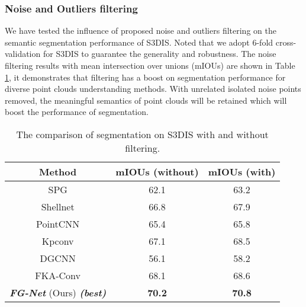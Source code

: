 \documentclass[journal]{IEEEtran}
\begin{document}
\subsubsection{Noise and Outliers filtering}
We have tested the influence of proposed noise and outliers filtering on the semantic segmentation performance of S3DIS. Noted that we adopt 6-fold cross-validation for S3DIS to guarantee the generality and robustness. The noise filtering results with mean intersection over unions (mIOUs) are shown in Table \ref{table_filter}, it demonstrates that filtering has a boost on segmentation performance for diverse point clouds understanding methods. With unrelated isolated noise points removed, the meaningful semantics of point clouds will be retained which will boost the performance of segmentation.
\begin{table}[bp!]
\caption{The comparison of segmentation on S3DIS with and without filtering.}
\label{table_filter}
\begin{center}
\begin{tabular}{ccc}
\toprule


Method & mIOUs (without) & mIOUs (with)\\

\hline
SPG\cite{landrieu2019point}&62.1&63.2\\ 

Shellnet\cite{zhang2019shellnet}&66.8&67.9\\

PointCNN\cite{wu2019pointconv}&65.4&65.8\\

Kpconv\cite{thomas2019kpconv}&67.1&68.5\\

DGCNN\cite{wang2019dynamic}&56.1&58.2\\
FKA-Conv\cite{boulch2020fka}&68.1&68.6\\
\textbf{\textit{FG-Net}} (Ours) \textbf{\textit{(best)}}&\textbf{70.2}&\textbf{70.8}\\
\bottomrule
\end{tabular}
\end{center}
\vspace{-2mm}
\end{table}
\end{document}
